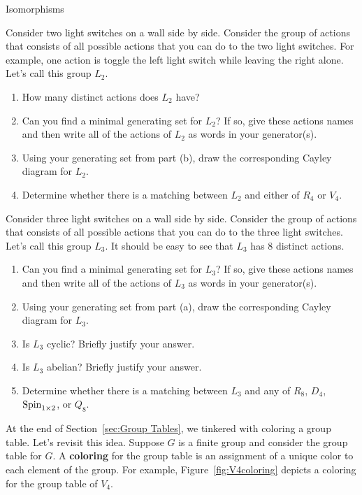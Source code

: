 \begin{section}{Isomorphisms}
\begin{problem}
Consider two light switches on a wall side by side.  Consider the group of actions that consists of all possible actions that you can do to the two light switches.  For example, one action is toggle the left light switch while leaving the right alone.  Let's call this group $L_2$.
\begin{enumerate}[label=\textrm{(\alph*)}]
\item How many distinct actions does $L_2$ have?
\item Can you find a minimal generating set for $L_2$?  If so, give these actions names and then write all of the actions of $L_2$ as words in your generator(s).
\item Using your generating set from part (b), draw the corresponding Cayley diagram for $L_2$.
\item Determine whether there is a matching between $L_2$ and either of $R_4$ or $V_4$.
\end{enumerate}
\end{problem}

\begin{problem}
Consider three light switches on a wall side by side.  Consider the group of actions that consists of all possible actions that you can do to the three light switches. Let's call this group $L_3$. It should be easy to see that $L_3$ has 8 distinct actions.
\begin{enumerate}[label=\textrm{(\alph*)}]
\item Can you find a minimal generating set for $L_3$?  If so, give these actions names and then write all of the actions of $L_3$ as words in your generator(s).
\item Using your generating set from part (a), draw the corresponding Cayley diagram for $L_3$.
\item Is $L_3$ cyclic? Briefly justify your answer.
\item Is $L_3$ abelian? Briefly justify your answer.
\item Determine whether there is a matching between $L_3$ and any of $R_8$, $D_4$, $\operatorname{Spin}_{1\times 2}$, or $Q_8$.
\end{enumerate}
\end{problem}

At the end of Section~\ref{sec:Group Tables}, we tinkered with coloring a group table.  Let's revisit this idea. Suppose $G$ is a finite group and consider the group table for $G$.  A \textbf{coloring} for the group table is an assignment of a unique color to each element of the group.  For example, Figure~\ref{fig:V4coloring} depicts a coloring for the group table of $V_4$.


\end{section}
